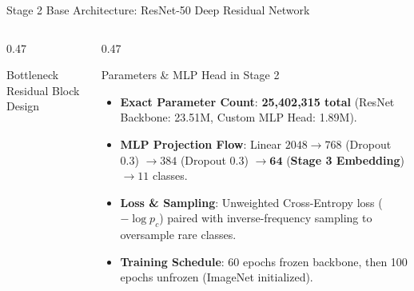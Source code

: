 \documentclass[aspectratio=169, 10pt]{beamer}
\begin{document}
\begin{frame}{Stage 2 Base Architecture: ResNet-50 Deep Residual Network}
\begin{columns}[onlytextwidth, t]
\begin{column}{0.47\textwidth}
\begin{block}{Bottleneck Residual Block Design}
{{
        }
      }
    \end{block}
  \end{column}
  \hfill
  \begin{column}{0.47\textwidth}
    \begin{block}{Parameters \& MLP Head in Stage 2}
      \parbox[t][2.85cm][t]{\linewidth}{
        \begin{itemize}\tiny
          \item \textbf{Exact Parameter Count}: \textbf{25,402,315 total} (ResNet Backbone: 23.51M, Custom MLP Head: 1.89M).
          \item \textbf{MLP Projection Flow}: Linear $2048 \rightarrow 768$ (Dropout 0.3) $\rightarrow 384$ (Dropout 0.3) $\rightarrow \mathbf{64}$ (\textbf{Stage 3 Embedding}) $\rightarrow 11$ classes.
          \item \textbf{Loss \& Sampling}: Unweighted Cross-Entropy loss ($-\log p_c$) paired with inverse-frequency sampling to oversample rare classes.
          \item \textbf{Training Schedule}: 60 epochs frozen backbone, then 100 epochs unfrozen (ImageNet initialized).
        \end{itemize}
      }
    \end{block}
  \end{column}
\end{columns}
\end{frame}
\end{document}

